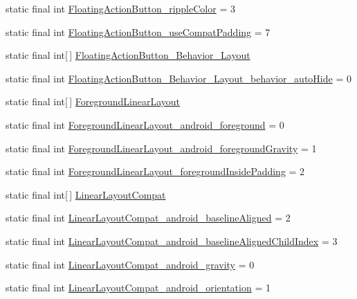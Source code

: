 \begin{CompactItemize}
static final int \hyperlink{classandroid_1_1support_1_1v4_1_1_r_1_1styleable_a03ae583d77273636cb0e624e75b3148}{FloatingActionButton\_\-rippleColor} = 3
\item 
static final int \hyperlink{classandroid_1_1support_1_1v4_1_1_r_1_1styleable_ae0dde9e7a05bead4f8562d2d2696661}{FloatingActionButton\_\-useCompatPadding} = 7
\item 
static final int\mbox{[}$\,$\mbox{]} \hyperlink{classandroid_1_1support_1_1v4_1_1_r_1_1styleable_74fa04356d75314efc459f06cb2b13ea}{FloatingActionButton\_\-Behavior\_\-Layout}
\item 
static final int \hyperlink{classandroid_1_1support_1_1v4_1_1_r_1_1styleable_be88362aba18b70cdf8373813b961911}{FloatingActionButton\_\-Behavior\_\-Layout\_\-behavior\_\-autoHide} = 0
\item 
static final int\mbox{[}$\,$\mbox{]} \hyperlink{classandroid_1_1support_1_1v4_1_1_r_1_1styleable_bbe0a7c41b965e1656d09f3bc52b2751}{ForegroundLinearLayout}
\item 
static final int \hyperlink{classandroid_1_1support_1_1v4_1_1_r_1_1styleable_07d1b8161309552e2bdeaabfe9a14379}{ForegroundLinearLayout\_\-android\_\-foreground} = 0
\item 
static final int \hyperlink{classandroid_1_1support_1_1v4_1_1_r_1_1styleable_360249f2f1dfcbff7fbdc1596e41e43d}{ForegroundLinearLayout\_\-android\_\-foregroundGravity} = 1
\item 
static final int \hyperlink{classandroid_1_1support_1_1v4_1_1_r_1_1styleable_24c3790a2ccc17ca22f459138b2b1299}{ForegroundLinearLayout\_\-foregroundInsidePadding} = 2
\item 
static final int\mbox{[}$\,$\mbox{]} \hyperlink{classandroid_1_1support_1_1v4_1_1_r_1_1styleable_d67ed8d09a6471da7a8c3ba1552dad7e}{LinearLayoutCompat}
\item 
static final int \hyperlink{classandroid_1_1support_1_1v4_1_1_r_1_1styleable_8ff8a96f123f37d28206811c345732e4}{LinearLayoutCompat\_\-android\_\-baselineAligned} = 2
\item 
static final int \hyperlink{classandroid_1_1support_1_1v4_1_1_r_1_1styleable_03736db57a910e8d6ce3bc7dc999fcfe}{LinearLayoutCompat\_\-android\_\-baselineAlignedChildIndex} = 3
\item 
static final int \hyperlink{classandroid_1_1support_1_1v4_1_1_r_1_1styleable_1eb5d592245dd2ab2fe144f2aea87553}{LinearLayoutCompat\_\-android\_\-gravity} = 0
\item 
static final int \hyperlink{classandroid_1_1support_1_1v4_1_1_r_1_1styleable_2fab5c4e37d706c344112f0c3adfdeda}{LinearLayoutCompat\_\-android\_\-orientation} = 1

\end{CompactItemize}
